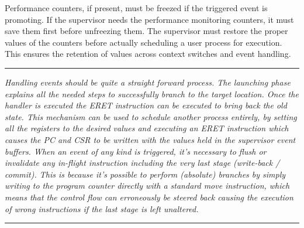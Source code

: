         \vspace{10pt}

        Performance counters, if present, must be freezed if the triggered event is promoting. If the supervisor needs the performance monitoring counters, it must save them first before unfreezing them. The supervisor must restore the proper values of the counters before actually scheduling a user process for execution. This ensures the retention of values across context switches and event handling.

    \par\noindent\rule{\textwidth}{0.4pt}
    \textit{Handling events should be quite a straight forward process. The launching phase explains all the needed steps to successfully branch to the target location. Once the handler is executed the ERET instruction can be executed to bring back the old state. This mechanism can be used to schedule another process entirely, by setting all the registers to the desired values and executing an ERET instruction which causes the PC and CSR to be written with the values held in the supervisor event buffers. When an event of any kind is triggered, it's necessary to flush or invalidate any in-flight instruction including the very last stage (write-back / commit). This is because it's possible to perform (absolute) branches by simply writing to the program counter directly with a standard move instruction, which means that the control flow can erroneously be steered back causing the execution of wrong instructions if the last stage is left unaltered.}
    \par\noindent\rule{\textwidth}{0.4pt}

    \vspace{10pt}
    
    \vspace{10pt}
    
    \vspace{10pt}